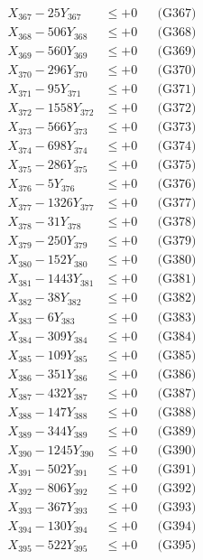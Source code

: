 \documentclass[a4paper,10pt]{article}
\begin{document}
{\begin{align}
X_{367} - 25Y_{367} &\leq +0 && \text{(G367)} \\
X_{368} - 506Y_{368} &\leq +0 && \text{(G368)} \\
X_{369} - 560Y_{369} &\leq +0 && \text{(G369)} \\
X_{370} - 296Y_{370} &\leq +0 && \text{(G370)} \\
\allowbreak
X_{371} - 95Y_{371} &\leq +0 && \text{(G371)} \\
X_{372} - 1558Y_{372} &\leq +0 && \text{(G372)} \\
X_{373} - 566Y_{373} &\leq +0 && \text{(G373)} \\
X_{374} - 698Y_{374} &\leq +0 && \text{(G374)} \\
X_{375} - 286Y_{375} &\leq +0 && \text{(G375)} \\
X_{376} - 5Y_{376} &\leq +0 && \text{(G376)} \\
X_{377} - 1326Y_{377} &\leq +0 && \text{(G377)} \\
X_{378} - 31Y_{378} &\leq +0 && \text{(G378)} \\
X_{379} - 250Y_{379} &\leq +0 && \text{(G379)} \\
X_{380} - 152Y_{380} &\leq +0 && \text{(G380)} \\
\allowbreak
X_{381} - 1443Y_{381} &\leq +0 && \text{(G381)} \\
X_{382} - 38Y_{382} &\leq +0 && \text{(G382)} \\
X_{383} - 6Y_{383} &\leq +0 && \text{(G383)} \\
X_{384} - 309Y_{384} &\leq +0 && \text{(G384)} \\
X_{385} - 109Y_{385} &\leq +0 && \text{(G385)} \\
X_{386} - 351Y_{386} &\leq +0 && \text{(G386)} \\
X_{387} - 432Y_{387} &\leq +0 && \text{(G387)} \\
X_{388} - 147Y_{388} &\leq +0 && \text{(G388)} \\
X_{389} - 344Y_{389} &\leq +0 && \text{(G389)} \\
X_{390} - 1245Y_{390} &\leq +0 && \text{(G390)} \\
\allowbreak
X_{391} - 502Y_{391} &\leq +0 && \text{(G391)} \\
X_{392} - 806Y_{392} &\leq +0 && \text{(G392)} \\
X_{393} - 367Y_{393} &\leq +0 && \text{(G393)} \\
X_{394} - 130Y_{394} &\leq +0 && \text{(G394)} \\
X_{395} - 522Y_{395} &\leq +0 && \text{(G395)} \\

\end{align}}
\end{document}
